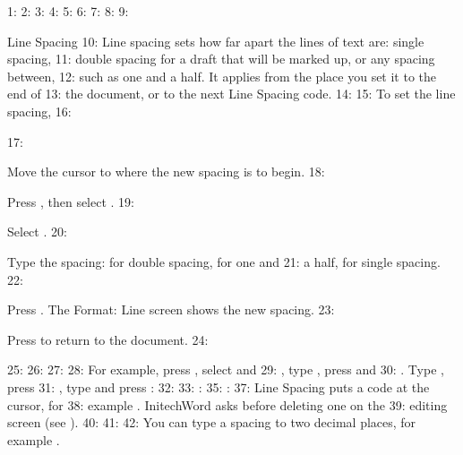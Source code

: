 1: %
2: %
3: %
4: %
5: %
6: %
7: %
8: 
9: \begin{Feature}{Line Spacing}
10: Line spacing sets how far apart the lines of text are: single spacing,
11: double spacing for a draft that will be marked up, or any spacing between,
12: such as one and a half.  It applies from the place you set it to the end of
13: the document, or to the next Line Spacing code.
14: 
15: To set the line spacing,
16: \begin{WPSteps}
17: \item Move the cursor to where the new spacing is to begin.
18: \item Press , then select .
19: \item Select .
20: \item Type the spacing:  for double spacing,  for one and
21: a half,  for single spacing.
22: \item Press .  The Format: Line screen shows the new spacing.
23: \item Press  to return to the document.
24: \end{WPSteps}
25: 
26: 
27: 
28: For example, press , select  and
29: , type , press  and
30: .  Type , press
31: , type  and press :
32: 
33: : 
35: : 
37: Line Spacing puts a  code at the cursor, for
38: example \Code{[Ln Spacing:2]}.  InitechWord asks before deleting one on the
39: editing screen (see ).
40: 
41: 
42: You can type a spacing to two decimal places, for example .

\end{Feature}
